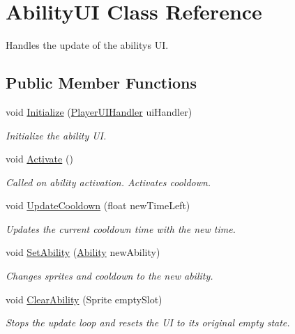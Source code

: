 \hypertarget{class_ability_u_i}{}\section{Ability\+UI Class Reference}
\label{class_ability_u_i}


Handles the update of the abilitys UI.  


\subsection*{Public Member Functions}
\begin{DoxyCompactItemize}
\item 
void \hyperlink{class_ability_u_i_aaf2088cb076c1e2139d33c543104db82}{Initialize} (\hyperlink{class_player_u_i_handler}{Player\+U\+I\+Handler} ui\+Handler)
\begin{DoxyCompactList}\small\item\em Initialize the ability UI. \end{DoxyCompactList}\item 
void \hyperlink{class_ability_u_i_a710422c1bba0de889a758cffbc20659a}{Activate} ()
\begin{DoxyCompactList}\small\item\em Called on ability activation. Activates cooldown. \end{DoxyCompactList}\item 
void \hyperlink{class_ability_u_i_a64f213c19ca4bb23414f0b8c532b98c7}{Update\+Cooldown} (float new\+Time\+Left)
\begin{DoxyCompactList}\small\item\em Updates the current cooldown time with the new time. \end{DoxyCompactList}\item 
void \hyperlink{class_ability_u_i_aa92482fc1ded5c2c07b9fcfd7298bcf9}{Set\+Ability} (\hyperlink{class_ability}{Ability} new\+Ability)
\begin{DoxyCompactList}\small\item\em Changes sprites and cooldown to the new ability. \end{DoxyCompactList}\item 
void \hyperlink{class_ability_u_i_aff8d54091c080f741980220b59277a30}{Clear\+Ability} (Sprite empty\+Slot)
\begin{DoxyCompactList}\small\item\em Stops the update loop and resets the UI to its original empty state. \end{DoxyCompactList}\end{DoxyCompactItemize}

